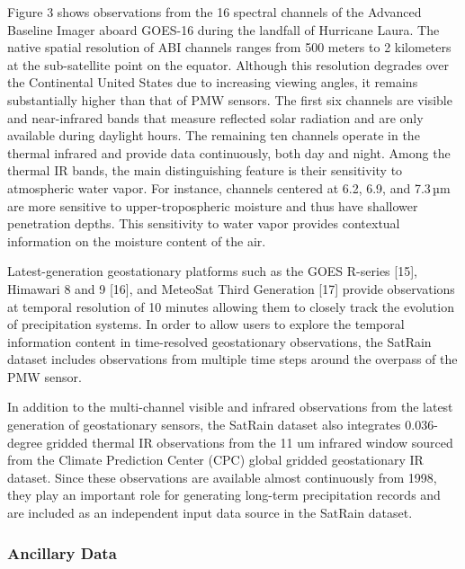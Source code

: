 \documentclass[11pt]{article}
\begin{document}
Figure 3 shows observations from the 16 spectral channels of the Advanced
Baseline Imager aboard GOES-16 during the landfall of Hurricane Laura. The
native spatial resolution of ABI channels ranges from 500 meters to 2 kilometers
at the sub-satellite point on the equator. Although this resolution degrades
over the Continental United States due to increasing viewing angles, it remains
substantially higher than that of PMW sensors. The first six channels are
visible and near-infrared bands that measure reflected solar radiation and are
only available during daylight hours. The remaining ten channels operate in the
thermal infrared and provide data continuously, both day and night. Among the
thermal IR bands, the main distinguishing feature is their sensitivity to
atmospheric water vapor. For instance, channels centered at 6.2, 6.9, and 7.3 µm
are more sensitive to upper-tropospheric moisture and thus have shallower
penetration depths. This sensitivity to water vapor provides contextual
information on the moisture content of the air.

Latest-generation geostationary platforms such as the GOES R-series [15],
Himawari 8 and 9 [16], and MeteoSat Third Generation [17] provide observations
at temporal resolution of 10 minutes allowing them to closely track the
evolution of precipitation systems. In order to allow users to explore the
temporal information content in time-resolved geostationary observations, the
SatRain dataset includes observations from multiple time steps around the
overpass of the PMW sensor.

In addition to the multi-channel visible and infrared observations from the
latest generation of geostationary sensors, the SatRain dataset also integrates
0.036-degree gridded thermal IR observations from the 11 um infrared window
sourced from the Climate Prediction Center (CPC) global gridded geostationary IR
dataset. Since these observations are available almost continuously from 1998,
they play an important role for generating long-term precipitation records and
are included as an independent input data source in the SatRain dataset.

\subsubsection{Ancillary Data}
\end{document}
